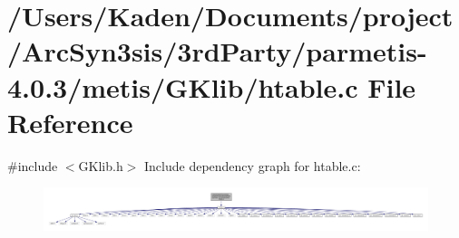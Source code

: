 \hypertarget{a00098}{}\section{/\+Users/\+Kaden/\+Documents/project/\+Arc\+Syn3sis/3rd\+Party/parmetis-\/4.0.3/metis/\+G\+Klib/htable.c File Reference}
\label{a00098}
{\ttfamily \#include $<$G\+Klib.\+h$>$}\newline
Include dependency graph for htable.\+c\+:\nopagebreak
\begin{figure}[H]
\begin{center}
\leavevmode
\includegraphics[width=350pt]{a00099}
\end{center}
\end{figure}
